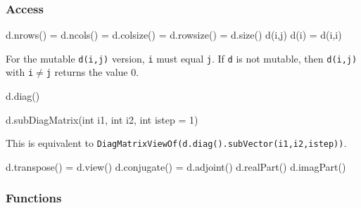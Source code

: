 \documentclass[twoside,letterpaper,11pt]{article}
\renewcommand{\tt}[1]{{\lstinline {#1}}}
\begin{document}
\subsubsection{Access}

\begin{tmvcode}
d.nrows() = d.ncols() = d.colsize() = d.rowsize() = d.size()
d(i,j)
d(i) = d(i,i)
\end{tmvcode}
For the mutable \tt{d(i,j)} version, 
\tt{i} must equal \tt{j}.
If \tt{d} is not mutable, then \tt{d(i,j)} with \tt{i}$\neq$\tt{j} returns the 
value 0.

\begin{tmvcode}
d.diag()
\end{tmvcode}

\begin{tmvcode}
d.subDiagMatrix(int i1, int i2, int istep = 1)
\end{tmvcode}
This is equivalent to \tt{DiagMatrixViewOf(d.diag().subVector(i1,i2,istep))}.
\begin{tmvcode}
d.transpose() = d.view()
d.conjugate() = d.adjoint()
d.realPart()
d.imagPart()
\end{tmvcode}

\subsubsection{Functions}
\end{document}
